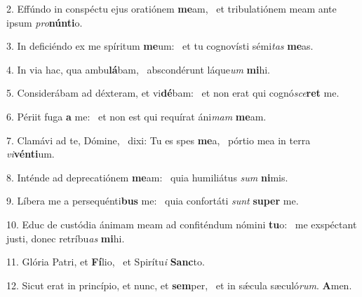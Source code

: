 2. Effúndo in conspéctu ejus oratiónem \textbf{me}am, \ast\  et tribulatiónem meam ante ipsum \textit{pro}\textbf{nún}\textbf{ti}o.\

3. In deficiéndo ex me spíritum \textbf{me}um: \ast\  et tu cognovísti sémi\textit{tas} \textbf{me}as.\

4. In via hac, qua ambu\textbf{lá}bam, \ast\  abscondérunt láque\textit{um} \textbf{mi}hi.\

5. Considerábam ad déxteram, et vi\textbf{dé}bam: \ast\  et non erat qui cognó\textit{sce}\textbf{ret} me.\

6. Périit fuga \textbf{a} me: \ast\  et non est qui requírat áni\textit{mam} \textbf{me}am.\

7. Clamávi ad te, Dómine, \dag\  dixi: Tu es spes \textbf{me}a, \ast\  pórtio mea in terra \textit{vi}\textbf{vén}\textbf{ti}um.\

8. Inténde ad deprecatiónem \textbf{me}am: \ast\  quia humiliátus \textit{sum} \textbf{ni}mis.\

9. Líbera me a persequénti\textbf{bus} me: \ast\  quia confortáti \textit{sunt} \textbf{su}\textbf{per} me.\

10. Educ de custódia ánimam meam ad confiténdum nómini \textbf{tu}o: \ast\  me exspéctant justi, donec retríbu\textit{as} \textbf{mi}hi.\

11. Glória Patri, et \textbf{Fí}lio, \ast\  et Spirítu\textit{i} \textbf{Sanc}to.\

12. Sicut erat in princípio, et nunc, et \textbf{sem}per, \ast\  et in sǽcula sæculó\textit{rum}. \textbf{A}men.\

